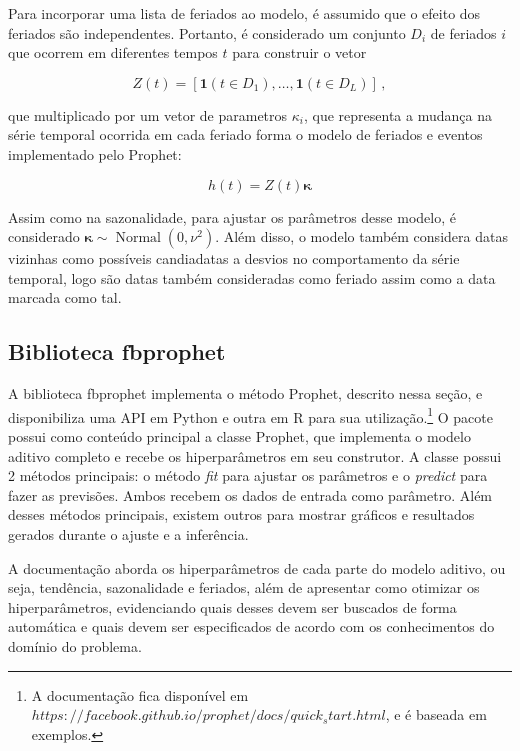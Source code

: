 Para incorporar uma lista de feriados ao modelo, é assumido que o efeito dos feriados são independentes. Portanto, é considerado um conjunto $D_{i}$ de feriados $i$ que ocorrem em diferentes tempos $t$ para construir o vetor

\begin{equation}
    Z(t)=\left[\mathbf{1}\left(t \in D_{1}\right), \ldots, \mathbf{1}\left(t \in D_{L}\right)\right] \, ,
\end{equation}

que multiplicado por um vetor de parametros $\kappa_{i}$, que representa a mudança na série temporal ocorrida em cada feriado forma o modelo de feriados e eventos implementado pelo Prophet:

\begin{equation}
    h(t)=Z(t) \boldsymbol{\kappa}
\end{equation}

Assim como na sazonalidade, para ajustar os parâmetros desse modelo, é considerado $\boldsymbol{\kappa} \sim \operatorname{Normal}\left(0, \nu^{2}\right) .$ Além disso, o modelo também considera datas vizinhas como possíveis candiadatas a desvios no comportamento da série temporal, logo são datas também consideradas como feriado assim como a data marcada como tal.

\subsection{Biblioteca fbprophet}
A biblioteca fbprophet implementa o método Prophet, descrito nessa seção, e disponibiliza uma API em Python e outra em R para sua utilização.\footnote{A documentação fica disponível em $https://facebook.github.io/prophet/docs/quick_start.html$, e é baseada em exemplos.} O pacote possui como conteúdo principal a classe Prophet, que implementa o modelo aditivo completo e recebe os hiperparâmetros em seu construtor. A classe possui 2 métodos principais: o método \textit{fit} para ajustar os parâmetros e o \textit{predict} para fazer as previsões. Ambos recebem os dados de entrada como parâmetro. Além desses métodos principais, existem outros para mostrar gráficos e resultados gerados durante o ajuste e a inferência.

A documentação aborda os hiperparâmetros de cada parte do modelo aditivo, ou seja, tendência, sazonalidade e feriados, além de apresentar como otimizar os hiperparâmetros, evidenciando quais desses devem ser buscados de forma automática e quais devem ser especificados de acordo com os conhecimentos do domínio do problema.
